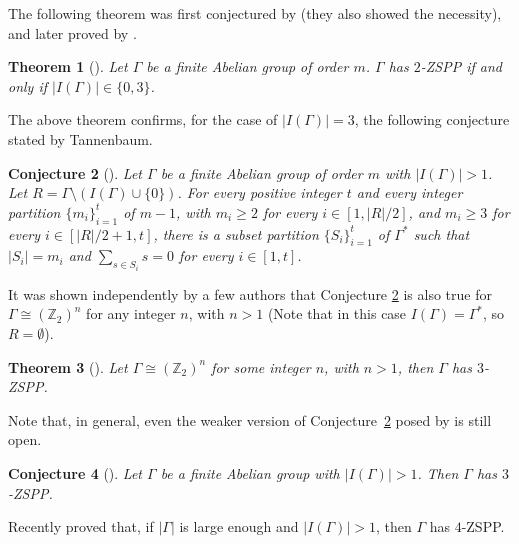 \documentclass[final]{dmtcs-episciences}
\newtheorem{thm}{Theorem}[section]
\newtheorem{conj}[thm]{Conjecture}
\newcommand{\zet}{\mathbb{Z}}
\begin{document}
The following theorem was first conjectured by \citet{KLR} (they also showed the necessity), and later proved by \citet{Zeng}.
\begin{thm}[\citet{Zeng}]\label{Zeng}Let $\Gamma$ be a finite Abelian group of order $m$. $\Gamma$ has $2$-ZSPP if and only if $|I(\Gamma)|\in\{0,3\}$. 
\end{thm}

The above theorem confirms, for the case of $|I(\Gamma)|=3$, the following conjecture stated by Tannenbaum. 
\begin{conj}[\citet{Tannenbaum1}]\label{conjectureT}
Let $\Gamma$ be a finite Abelian group of order $m$ with $|I(\Gamma)|>1$. Let $R =\Gamma \setminus (I(\Gamma)\cup\{0\})$. For every positive integer $t$ and every integer partition $\{m_i\}_{i=1}^t$ of $m-1$, with $m_i \geq 2$ for every {$i\in [1, |R|/2]$}, and {$m_i \geq 3$} for every {$i\in[|R|/2+1, t]$}, there is a subset partition $\{S_i\}_{i=1}^t$ of $\Gamma^*$ such that $|S_i| = m_i$ and $\sum_{s\in S_i}s = 0$ for every {$i\in[ 1, t]$}. 
\end{conj}
It was shown independently by a few authors that Conjecture \ref{conjectureT} is also true for $\Gamma\cong (\zet_2)^n$ for any integer $n$, with $n>1$ (Note that in this case $I(\Gamma)=\Gamma^*$, so $R=\emptyset$).

\begin{thm}[\citet{ref:CaccJia,Egawa,Tannenbaum2}]\label{Sylow}Let $\Gamma\cong (\zet_2)^n$ for some integer $n$, with $n>1$, then $\Gamma$ has $3$-ZSPP. 
\end{thm}

Note that, in general, even the weaker version of Conjecture~\ref{conjectureT} posed by \citet{CicZ} is still open.
\begin{conj}[\citet{CicZ}]\label{conjecture}Let $\Gamma$ be a finite Abelian group with $|I(\Gamma)|>1$. Then $\Gamma$ has $3$-ZSPP. 
\end{conj}


Recently \citet{CicTuz} proved that, if $|\Gamma|$ is large enough and $|I(\Gamma)|>1$, then $\Gamma$ has $4$-ZSPP. 
\end{document}
